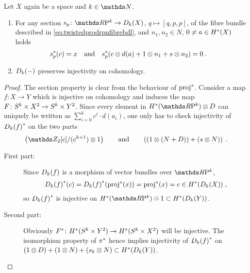 \begin{Cor}
  Let $X$ again be a space and $k\in\Nat$.
  \begin{enumerate}
  \item
    For any section $s_p\colon\RP k\to\Twistedprod{k}{X}$, $q\mapsto[q,p,p]$,
    of the fibre bundle described in
    \eqref{eq:twistedprodrpnfibrebdl}, and $n_1,n_2\in N$, $0\neq a\in H^*(X)$ holds
    \begin{align}\label{eq:twistedprodcohom:section}
      {s}^*_p(c) &= x
      &\text{and}&
      &{s}^*_p(c\otimes d(a) + 1\otimes n_1 + s\otimes n_2) &= 0
                                                              \;.
    \end{align}
  \item\label{item:twistedprod:preservescohominj}
    $D_{k}({-})$ preserves injectivity on cohomology.
  \end{enumerate}
  \begin{proof}
    The section property is clear from the behaviour of ${\mathrm{proj}}^*$.
    Consider a map $f\colon X\to Y$ which is injective on cohomology
    and induces the map
    $F\colon S^{k}\times X^2\to S^{k}\times Y^2$.
    Since every element in $\H^*(\RP k)\otimes D$ can uniquely be
    written as $\sum_{i=0}^k c^i\cdot d(a_i)$,
    one only has to check injectivity of ${D_{k}({f})}^*$ on
    the two parts
    \begin{gather*}
      \left( \Zmod2[c]/(c^{k+1})\otimes 1 \right)
      \qquad\text{and}\qquad
      \left(
        (1\otimes (N+D)) + (s\otimes N)
      \right)
      \;.
    \end{gather*}
    \begin{description}
    \item[First part:]
      Since $D_{k}({f})$ is a morphism of vector bundles over
      $\RP k$,
      \begin{gather*}
        {D_{k}({f})}^*(c)
        = {D_{k}({f})}^*({\mathrm{proj}}^*(x))
        = {\mathrm{proj}}^*(x)
        = c
        \in H^*(D_{k}({X}))
        \;,
      \end{gather*}
      so ${D_{k}({f})}^*$ is injective on
      $\H^*(\RP k)\otimes 1\subset\H^*(\Twistedprod k Y)$.
    \item[Second part:]
      Obviously
      ${F}^*\colon H^*(S^{k}\times Y^2)\to H^*(S^{k}\times X^2)$ 
      will be injective. The isomorphism property of ${\pi}^*$ hence
      implies injectivity of ${D_{k}({f})}^*$ on
      $(1\otimes D)+(1\otimes N)+(s_k\otimes N)\subset H^*(D_{k}({Y}))$.
      \qedhere
    \end{description}
  \end{proof}
\end{Cor}

